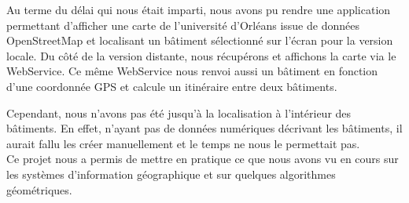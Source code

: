 \documentclass[12pt,a4paper,oneside]{article}
\begin{document}
Au terme du délai qui nous était imparti, nous avons pu rendre une application permettant
d'afficher une carte de l'université d'Orléans issue de données OpenStreetMap et localisant
un bâtiment sélectionné sur l'écran pour la version locale.
Du côté de la version distante, nous récupérons et affichons la carte via le WebService.
Ce même WebService nous renvoi aussi un bâtiment en fonction d'une coordonnée GPS et
calcule un itinéraire entre deux bâtiments.

Cependant, nous n'avons pas été jusqu'à la localisation à l'intérieur des bâtiments.
En effet, n'ayant pas de données numériques décrivant les bâtiments,
il aurait fallu les créer manuellement et le temps ne nous le permettait pas.
\\

Ce projet nous a permis de mettre en pratique ce que nous avons vu en cours sur les systèmes
d'information géographique et sur quelques algorithmes géométriques.


\appendix
\end{document}
